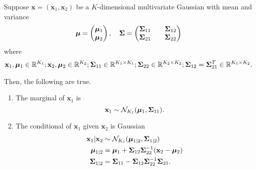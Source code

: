 \begin{theorem}\label{thm:ogag}
    Suppose $\mathbf{x} = (\mathbf{x}_1, \mathbf{x}_2)$ be a $K$-dimensional multivariate Gaussian with mean and variance
    \begin{equation*}
        \boldsymbol{\mu} =
        \begin{pmatrix}
            \boldsymbol{\mu}_1 \\
            \boldsymbol{\mu}_2
        \end{pmatrix}
        ,\quad
        \boldsymbol{\Sigma} =
        \begin{pmatrix}
            \boldsymbol{\Sigma}_{11} &  & \boldsymbol{\Sigma}_{12} \\
            \boldsymbol{\Sigma}_{21} &  & \boldsymbol{\Sigma}_{22} \\
        \end{pmatrix}
    \end{equation*}
    where
    \begin{align*}
        \mathbf{x}_1, \boldsymbol{\mu}_1 \in \mathbb{R}^{K_1};
        \mathbf{x}_2, \boldsymbol{\mu}_2 \in \mathbb{R}^{K_2};
        \boldsymbol{\Sigma}_{11} \in \mathbb{R}^{K_1 \times K_1};
        \boldsymbol{\Sigma}_{22} \in \mathbb{R}^{K_2 \times K_2};
        \boldsymbol{\Sigma}_{12} = \boldsymbol{\Sigma}_{21}^{T} \in \mathbb{R}^{K_1 \times K_2}.
    \end{align*}

    Then, the following are true.
    \begin{enumerate}
        \item
            The marginal of $\mathbf{x}_1$ is
            \begin{equation*}
                \mathbf{x}_{1} \sim \mathcal{N}_{K_1}(\boldsymbol{\mu}_1, \boldsymbol{\Sigma}_{11}).
            \end{equation*}

        \item
            The conditional of $\mathbf{x}_1$ given $\mathbf{x}_2$ is Gaussian
            \begin{align*}
                \mathbf{x}_1 | \mathbf{x}_2 &\sim \mathcal{N}_{K_1}(\boldsymbol{\mu}_{1 | 2}, \boldsymbol{\Sigma}_{1 | 2}) \\
                \boldsymbol{\mu}_{1 | 2} &= \boldsymbol{\mu}_1 + \boldsymbol{\Sigma}_{12} \boldsymbol{\Sigma}_{22}^{-1} (\mathbf{x}_2 - \boldsymbol{\mu}_2) \\
                \boldsymbol{\Sigma}_{1|2 } &= \boldsymbol{\Sigma}_{11} - \boldsymbol{\Sigma}_{12} \boldsymbol{\Sigma}_{22}^{-1} \boldsymbol{\Sigma}_{21}.
            \end{align*}


\end{enumerate}
\end{theorem}
